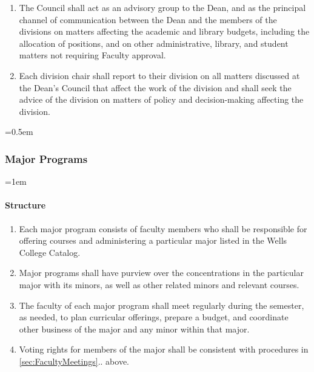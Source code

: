 \documentclass{manual}
\let\oldsubsubsection\subsubsection
\renewcommand\subsubsection{\leftskip=0.5em\oldsubsubsection}
\let\oldparagraph\paragraph
\renewcommand\paragraph{\leftskip=1em\oldparagraph}
\newcommand{\itemLevelA}{\alph*.}
\newcommand{\itemLevelB}{\arabic*)}
\newcommand{\itemLevelC}{\alph*)}
\newcommand{\itemRefA}{\alph*}
\newcommand{\itemRefB}{\arabic*}
\newcommand{\itemRefC}{\alph*}
\begin{document}
\begin{enumerate}[label=\itemLevelA,ref=\itemRefA]
\begin{enumerate}[label=\itemLevelB,ref=\itemRefB]
\begin{enumerate}[label=\itemLevelC,ref=\itemRefC]
\item The Council shall act as an advisory group to the Dean, and as the principal channel of communication between the Dean and the members of the divisions on matters affecting the academic and library budgets, including the allocation of positions, and on other administrative, library, and student matters not requiring Faculty approval.
\item Each division chair shall report to their division on all matters discussed at the Dean's Council that affect the work of the division and shall seek the advice of the division on matters of policy and decision-making affecting the division.
\end{enumerate}

\end{enumerate}

\end{enumerate}

\subsubsection{Major Programs}
\paragraph{Structure}
\begin{enumerate}[label=\itemLevelA,ref=\itemRefA]
\item Each major program consists of faculty members who shall be responsible for offering courses and administering a particular major listed in the Wells College Catalog.
\item Major programs shall have purview over the concentrations in the particular major with its minors, as well as other related minors and relevant courses.
\item The faculty of each major program shall meet regularly during the semester, as needed, to plan curricular offerings, prepare a budget, and coordinate other business of the major and any minor within that major.
\item Voting rights for members of the major shall be consistent with procedures in \cref{sec:FacultyMeetings}.. above. 
\end{enumerate}

\end{document}
